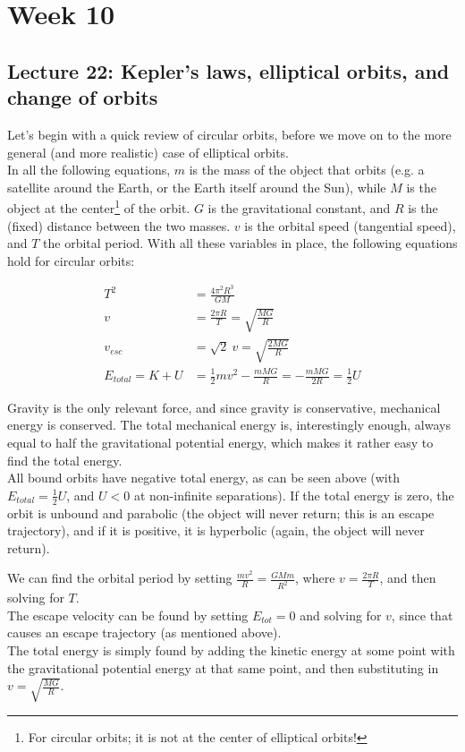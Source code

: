 \documentclass[8.01x]{subfiles}
\begin{document}
\chapter{Week 10}

\section{Lecture 22: Kepler's laws, elliptical orbits, and change of orbits}

Let's begin with a quick review of circular orbits, before we move on to the more general (and more realistic) case of elliptical orbits.\\
In all the following equations, $m$ is the mass of the object that orbits (e.g. a satellite around the Earth, or the Earth itself around the Sun), while $M$ is the object at the center\footnote{For circular orbits; it is not at the center of elliptical orbits!} of the orbit. $G$ is the gravitational constant, and $R$ is the (fixed) distance between the two masses. $v$ is the orbital speed (tangential speed), and $T$ the orbital period. With all these variables in place, the following equations hold for circular orbits:

\begin{align}
T^2 &= \frac{4 \pi^2 R^3}{G M}\\
v &= \frac{2 \pi R}{T} = \sqrt{\frac{M G}{R}}\\
v_{esc} &= \sqrt{2}\ v = \sqrt{\frac{2 M G}{R}}\\
E_{total} = K + U &= \frac{1}{2} m v^2 - \frac{m M G}{R} = - \frac{m M G}{2R} = \frac{1}{2} U
\end{align}

Gravity is the only relevant force, and since gravity is conservative, mechanical energy is conserved. The total mechanical energy is, interestingly enough, always equal to half the gravitational potential energy, which makes it rather easy to find the total energy.\\
All bound orbits have negative total energy, as can be seen above (with $E_{total} = \frac{1}{2} U$, and $U < 0$ at non-infinite separations). If the total energy is zero, the orbit is unbound and parabolic (the object will never return; this is an escape trajectory), and if it is positive, it is hyperbolic (again, the object will never return).

We can find the orbital period by setting $\displaystyle \frac{m v^2}{R} = \frac{G M m}{R^2}$, where $\displaystyle v = \frac{2 \pi R}{T}$, and then solving for $T$.\\
The escape velocity can be found by setting $E_{tot} = 0$ and solving for $v$, since that causes an escape trajectory (as mentioned above).\\
The total energy is simply found by adding the kinetic energy at some point with the gravitational potential energy at that same point, and then substituting in $\displaystyle v = \sqrt{\frac{M G}{R}}$.
\end{document}
